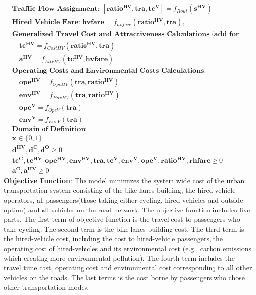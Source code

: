 \documentclass[trsc,nonblindrev]{informs3noheader}
\begin{document}
\begin{align}
\label{Restriping Existing Roads}\\
    &\textbf{Traffic Flow Assignment: } [\mathbf{\mathbf{ratio^{HV}}},\mathbf{tra},\mathbf{tc^V}]=f_{Rout}(\mathbf{s^{HV}}) \label{User Equilibrium Function}\\
  &\textbf{Hired Vehicle Fare: } \mathbf{hvfare}=f_{hvfare}(\mathbf{ratio^{HV}},\mathbf{tra}), \label{Fare Constraint}\\    
    &\textbf{Generalized Travel Cost and Attractiveness Calculations (add for Cyclists):} \nonumber \\
 &\quad\mathbf{tc^{HV}}=f_{CostHV}(\mathbf{ratio^{HV}},\mathbf{tra}) \label{ride-hailing cost}\\
&\quad\mathbf{a^{HV}}=f_{AttrHV}(\mathbf{tc^{HV}}, \mathbf{hvfare}) \label{AttracR}\\
    &\textbf{Operating Costs and Environmental Costs Calculations:} \nonumber \\
&\quad\mathbf{ope^{HV}}=f_{OpeHV}( \mathbf{tra}, \mathbf{ratio^{HV}})    \label{OpeVehicle}\\
&\quad\mathbf{env^{HV}}=f_{EnvHV}( \mathbf{tra}, \mathbf{ratio^{HV}})    \label{ExtVehicle}\\
&\quad\mathbf{ope^V}=f_{OpeV}( \mathbf{tra})  \label{OpeVehicleV}\\
&\quad\mathbf{env^V}=f_{EnvV}( \mathbf{tra})  \label{ExtVehicleV}\\
& \textbf{Domain of Definition:} \nonumber \\
&\mathbf{x} \in \{0,1\} \label{domain4}\\
&\mathbf{d^{HV}},\mathbf{d^{C}},\mathbf{d^{O}}\geq 0 \label{domain1}   \\
&\mathbf{tc^{C}},\mathbf{tc^{HV}},\mathbf{ope^{HV}},\mathbf{env^{HV}}, \mathbf{tra}, \mathbf{tc^{V}},\mathbf{env^V}, \mathbf{ope^V}, \mathbf{ratio^{HV}}, \mathbf{rhfare}\geq 0 \label{domain2}  \\
&\mathbf{a^{C}}, \mathbf{a^{HV}}\geq 0 \label{domain3}   
\end{align}
\textbf{Objective Function}: The model minimizes the system wide cost of the urban transportation system consisting of the bike lanes building, the hired vehicle operators, all passengers(those taking either cycling, hired-vehicles and outside option) and all vehicles on the road network. The objective function includes five parts. The first term of objective function is the travel cost to passengers who take cycling. The second term is the bike lanes building cost. The third term is the hired-vehicle cost, including the cost to hired-vehicle passengers, the operating cost of hired-vehicles and its environmental cost (e.g., carbon emissions which creating more environmental pollution). The fourth term includes the travel time cost, operating cost and environmental cost corresponding to all other vehicles on the roads. The last terms is the cost borne by passengers who chose other transportation modes.
\end{document}
